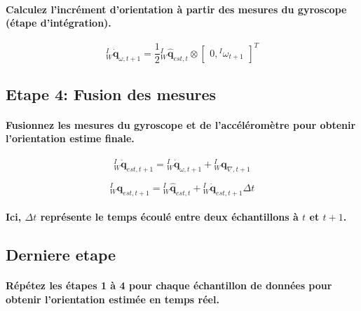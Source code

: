 \paragraph{Calculez l'incrément d'orientation à partir des mesures du gyroscope (étape d'intégration).}

\begin{equation}
	{}^{I}_{W}\dot{\mathbf{q}}_{\omega,t+1} = \frac{1}{2} {}^{I}_{W}\hat{\mathbf{q}}_{est,t}\otimes \begin{bmatrix} 0, {}^{I}\omega_{t+1} \end{bmatrix}^T
\end{equation}

\subsection{Etape 4: Fusion des mesures}

\paragraph{Fusionnez les mesures du gyroscope et de l'accéléromètre pour obtenir l'orientation estime finale.}

\begin{equation}
	{}^{I}_{W}\dot{\mathbf{q}}_{est, t+1} = {}^{I}_{W}\dot{\mathbf{q}}_{\omega, t+1} + {}^{I}_{W}\mathbf{q}_{\nabla, t+1}
\end{equation}

\begin{equation}
	{}^{I}_{W}\mathbf{q}_{est, t+1} = {}^{I}_{W}\hat{\mathbf{q}}_{est, t} + {}^{I}_{W}\mathbf{\dot{q}}_{est, t+1} \Delta t
\end{equation}

\paragraph{Ici, $\Delta t$ représente le temps écoulé entre deux échantillons à $t$ et $t+1$.}

\subsection{Derniere etape}

\paragraph{Répétez les étapes 1 à 4 pour chaque échantillon de données pour obtenir l'orientation estimée en temps réel.}

